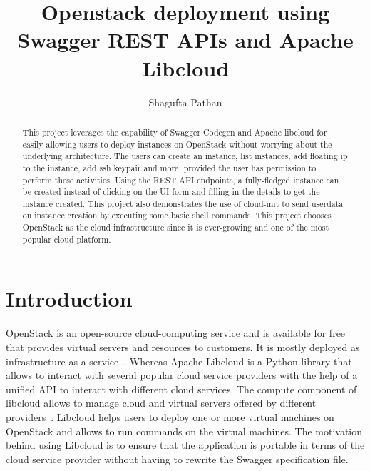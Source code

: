 
\title{Openstack deployment using Swagger REST APIs and Apache Libcloud}

\author{Shagufta Pathan}

\renewcommand{\shortauthors}{Shagufta}

\begin{abstract}
This project leverages the capability of Swagger Codegen and Apache libcloud 
for easily allowing users to deploy instances on OpenStack without worrying 
about the underlying architecture. The users can create an instance, list 
instances, add floating ip to the instance, add ssh keypair and more, provided 
the user has permission to perform these activities. Using the REST API 
endpoints, a fully-fledged instance can be created instead of clicking on the 
UI form and filling in the details to get the instance created. This project 
also demonstrates the use of cloud-init to send userdata on instance creation 
by executing some basic shell commands. This project chooses OpenStack as the 
cloud infrastructure since it is ever-growing and one of the most popular 
cloud platform.
\end{abstract}


\maketitle
\section{Introduction}
OpenStack is an open-source cloud-computing service and is available for free
that provides virtual servers and resources to customers. It is mostly 
deployed as infrastructure-as-a-service~\cite{hid-sp18-516-www-openstack}. 
Whereas Apache Libcloud is a Python library that allows to interact with 
several popular cloud service providers with the help of a unified API to 
interact with different cloud services. The compute component of libcloud 
allows to manage cloud and virtual servers offered by different 
providers~\cite{hid-sp18-516-www-libcloud}. Libcloud helps users to deploy one 
or more virtual machines on OpenStack and allows to run commands on the 
virtual machines. The motivation behind using Libcloud is to ensure that the 
application is portable in terms of the cloud service provider without having 
to rewrite the Swagger specification file.

